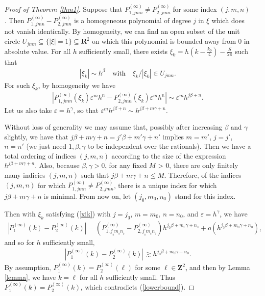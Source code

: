 \documentclass[12pt,lettersize]{article}
\renewcommand{\epsilon}{\varepsilon}
\theoremstyle{plain}%
\numberwithin{theorem}{section}
\numberwithin{equation}{section}
\theoremstyle{definition}
\theoremstyle{remark}
\begin{document}
{\begin{proof}[Proof of Theorem \ref{thm1}]
Suppose that $P^{(\infty)}_{1,jmn} \neq P^{(\infty)}_{2,jmn}$ for some index $(j,m,n)$. Then $P^{(\infty)}_{1,jmn} - P^{(\infty)}_{2,jmn}$ is a homogeneous polynomial of degree $j$ in $\xi$ which does not vanish identically. By homogeneity, we can find an open subset of the unit circle $U_{jmn} \subseteq \{|\xi| = 1\} \subseteq \mathbf{R}^2$ on which this polynomial is bounded away from 0 in absolute value. For all $h$ sufficiently small, there exists $\xi_k = h(k-\frac{k_0}{4}) - \frac{S}{2\pi}$ such that 
%
\begin{align}\label{xik}
|\xi_k| \sim h^\beta\quad \text{with}\quad \xi_k/|\xi_k| \in U_{jmn}.
\end{align}
%
For such $\xi_k$, by homogeneity we have
%
\begin{align*}{}
|P^{(\infty)}_{1,jmn}(\xi_k)\epsilon^mh^n-P^{(\infty)}_{2,jmn}(\xi_k)\epsilon^mh^n| \sim \epsilon^m h^{j\beta + n}.
\end{align*}
%
Let us also take $\epsilon = h^\gamma$, so that $\epsilon^m h^{j\beta +n} \sim h^{j \beta +m\gamma + n}$. 

Without loss of generality we may assume that, possibly after increasing $\beta$ and $\gamma$ slightly, we have that $j \beta +m\gamma+ n = j'\beta + m'\gamma + n'$ implies $m=m'$, $j=j'$, $n=n'$ (we just need $1,\beta,\gamma$ to be independent over the rationals). Then we have a total ordering of indices $(j,m,n)$ according to the size of the expression $h^{j\beta + m\gamma + n}$. Also, because $\beta, \gamma > 0$, for any fixed $M$ > 0, there are only finitely many indicies $(j,m,n)$ such that $j\beta + m\gamma + n \leq M$. Therefore, of the indices $(j,m,n)$ for which  $P^{(\infty)}_{1,jmn} \neq P^{(\infty)}_{2,jmn}$, there is a unique index for which $j\beta + m\gamma + n$ is minimal. From now on, let $(j_0,m_0,n_0)$ stand for this index. 

Then with $\xi_k$ satisfying (\ref{xik}) with $j=j_0$, $m=m_0$, $n=n_0$, and $\epsilon = h^\gamma$, we have
%
\begin{align}
|P^{(\infty)}_1(k) - P^{(\infty)}_2(k)| 
= (P^{(\infty)}_{1,j_{_0}m_{_0}n_{_0}}-P^{(\infty)}_{2, j_{_0} m_{_0} n_{_0}})h^{j_0\beta + m_0\gamma +n_0} + o(h^{j_0\beta+m_0\gamma + n_0}),
\end{align}
%
and so for $h$ sufficiently small, 
%
\begin{align}\label{lowerbound}
|P^{(\infty)}_1(k) - P^{(\infty)}_2(k)| \gtrsim h^{j_0\beta + m_0\gamma + n_0}.
\end{align}
%
By assumption, $P^{(\infty)}_1(k) = P^{(\infty)}_2(\ell)$ for some $\ell \in \mathbf{Z}^2$, and then by Lemma \ref{lemma}, we have $k = \ell$ for all $h$ sufficiently small. Thus $P^{(\infty)}_1(k) = P^{(\infty)}_2(k)$, which contradicts (\ref{lowerbound}).


\end{proof}}
\end{document}
